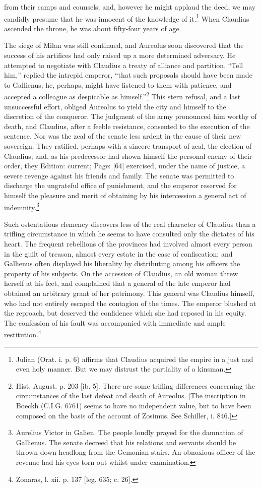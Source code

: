 from their camps and counsels; and, however he might applaud the deed, we may candidly presume that he was innocent of the knowledge of it.\footnote{Julian (Orat. i. p. 6) affirms that Claudius acquired the empire in a just and even holy manner. But we may distrust the partiality of a kinsman.} When Claudius ascended the throne, he was about fifty-four years of age.

The siege of Milan was still continued, and Aureolus soon discovered that the success of his artifices had only raised up a more determined adversary. He attempted to negotiate with Claudius a treaty of alliance and partition. \texthebrew{“}Tell him,\texthebrew{}” replied the intrepid emperor, \texthebrew{“}that such proposals should have been made to Gallienus; he, perhaps, might have listened to them with patience, and accepted a colleague as despicable as himself.\texthebrew{}”\footnote{Hist. August. p. 203 [ib. 5]. There are some trifling differences concerning the circumstances of the last defeat and death of Aureolus. [The inscription in Boeckh (C.I.G. 6761) seems to have no independent value, but to have been composed on the basis of the account of Zosimus. See Schiller, i. 846.]} This stern refusal, and a last unsuccessful effort, obliged Aureolus to yield the city and himself to the discretion of the conqueror. The judgment of the army pronounced him worthy of death, and Claudius, after a feeble resistance, consented to the execution of the sentence. Nor was the zeal of the senate less ardent in the cause of their new sovereign. They ratified, perhaps with a sincere transport of zeal, the election of Claudius; and, as his predecessor had shown himself the personal enemy of their order, they Edition: current; Page: [64] exercised, under the name of justice, a severe revenge against his friends and family. The senate was permitted to discharge the ungrateful office of punishment, and the emperor reserved for himself the pleasure and merit of obtaining by his intercession a general act of indemnity.\footnote{Aurelius Victor in Galien. The people loudly prayed for the damnation of Gallienus. The senate decreed that his relations and servants should be thrown down headlong from the Gemonian stairs. An obnoxious officer of the revenue had his eyes torn out whilst under examination.}

Such ostentatious clemency discovers less of the real character of Claudius than a trifling circumstance in which he seems to have consulted only the dictates of his heart. The frequent rebellions of the provinces had involved almost every person in the guilt of treason, almost every estate in the case of confiscation; and Gallienus often displayed his liberality by distributing among his officers the property of his subjects. On the accession of Claudius, an old woman threw herself at his feet, and complained that a general of the late emperor had obtained an arbitrary grant of her patrimony. This general was Claudius himself, who had not entirely escaped the contagion of the times. The emperor blushed at the reproach, but deserved the confidence which she had reposed in his equity. The confession of his fault was accompanied with immediate and ample restitution.\footnote{Zonaras, l. xii. p. 137 [leg. 635; c. 26].}

